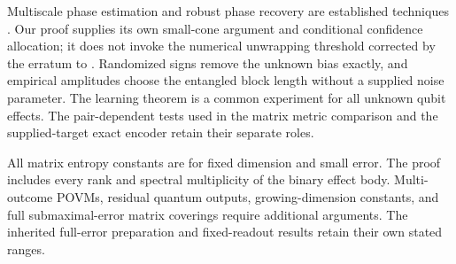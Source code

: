 Multiscale phase estimation and robust phase recovery are
established techniques \cite{HB76,KLY76}. Our proof supplies its
own small-cone argument and conditional confidence allocation;
it does not invoke the numerical unwrapping threshold corrected
by the erratum to \cite{KLY76}. Randomized signs remove the
unknown bias exactly, and empirical amplitudes choose the
entangled block length without a supplied noise parameter.
The learning theorem is a common experiment for all unknown
qubit effects. The pair-dependent tests used in the matrix
metric comparison and the supplied-target exact encoder retain
their separate roles.

All matrix entropy constants are for fixed dimension and small
error. The proof includes every rank and spectral multiplicity
of the binary effect body. Multi-outcome POVMs, residual quantum
outputs, growing-dimension constants, and full submaximal-error
matrix coverings require additional arguments. The inherited
full-error preparation and fixed-readout results retain their
own stated ranges.
